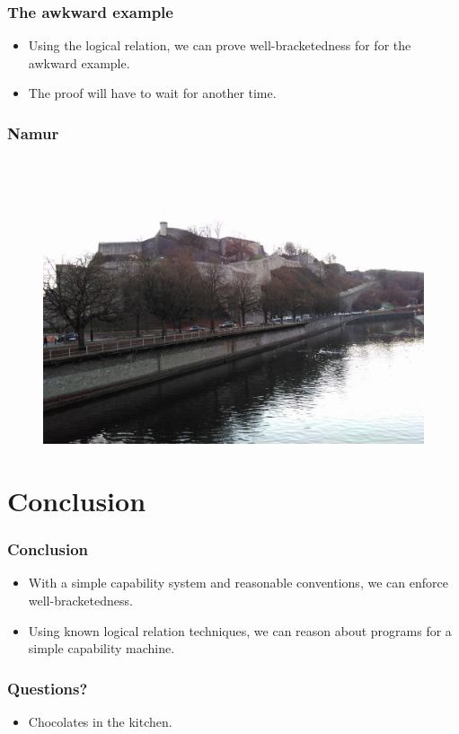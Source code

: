 \documentclass{beamer}
\begin{document}
\begin{frame}
  \frametitle{The awkward example}
  \begin{itemize}[<+->]
  \item Using the logical relation, we can prove well-bracketedness for for the awkward example.
  \item The proof will have to wait for another time.
  \end{itemize}
\vspace{1cm}
  \usebox{\awkwardex}
\end{frame}

\begin{frame}
  \frametitle{Namur}
  \begin{figure}
    \centering
    \includegraphics[scale=0.2]{nam}
\end{figure}
\end{frame}

\section{Conclusion}
\begin{frame}
  \frametitle{Conclusion}
  \begin{itemize}
  \item With a simple capability system and reasonable conventions, we can enforce well-bracketedness.
  \item Using known logical relation techniques, we can reason about programs for a simple capability machine.
  \end{itemize}
\end{frame}

\begin{frame}
  \frametitle{Questions?}
  \begin{itemize}
  \item<2-> Chocolates in the kitchen. 
  \end{itemize}
\end{frame}

\end{document}
